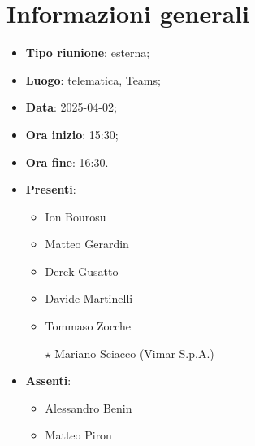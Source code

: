\section{Informazioni generali}
\begin{itemize}
  \item \textbf{Tipo riunione}: esterna;
  \item \textbf{Luogo}: telematica, Teams;
  \item \textbf{Data}: 2025-04-02;
  \item \textbf{Ora inizio}: 15:30;
  \item \textbf{Ora fine}: 16:30.
  
  \item \textbf{Presenti}:
  \begin{itemize}
    \item Ion Bourosu
    \item Matteo Gerardin
    \item Derek Gusatto
    \item Davide Martinelli
    \item Tommaso Zocche
    \item[$\star$] Mariano Sciacco (Vimar S.p.A.)
  \end{itemize}

  \item \textbf{Assenti}:
  \begin{itemize}
      \item Alessandro Benin
      \item Matteo Piron
  \end{itemize}
 
\end{itemize}
